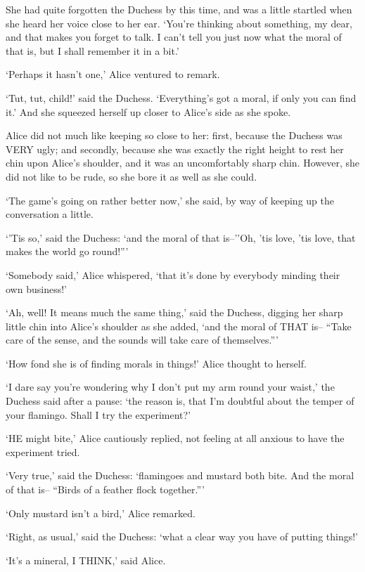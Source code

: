 \documentclass[12pt]{book}
\begin{document}
  She had quite forgotten the Duchess by this time, and was a
little startled when she heard her voice close to her ear.
`You're thinking about something, my dear, and that makes you
forget to talk.  I can't tell you just now what the moral of that
is, but I shall remember it in a bit.'

  `Perhaps it hasn't one,' Alice ventured to remark.

  `Tut, tut, child!' said the Duchess.  `Everything's got a
moral, if only you can find it.'  And she squeezed herself up
closer to Alice's side as she spoke.

  Alice did not much like keeping so close to her:  first,
because the Duchess was VERY ugly; and secondly, because she was
exactly the right height to rest her chin upon Alice's shoulder,
and it was an uncomfortably sharp chin.  However, she did not
like to be rude, so she bore it as well as she could.

  `The game's going on rather better now,' she said, by way of
keeping up the conversation a little.

  `'Tis so,' said the Duchess:  `and the moral of that is--''Oh,
'tis love, 'tis love, that makes the world go round!'''

  `Somebody said,' Alice whispered, `that it's done by everybody
minding their own business!'

  `Ah, well!  It means much the same thing,' said the Duchess,
digging her sharp little chin into Alice's shoulder as she added,
`and the moral of THAT is-- ``Take care of the sense, and the
sounds will take care of themselves.'''

  `How fond she is of finding morals in things!' Alice thought to
herself.

  `I dare say you're wondering why I don't put my arm round your
waist,' the Duchess said after a pause:  `the reason is, that I'm
doubtful about the temper of your flamingo.  Shall I try the
experiment?'

  `HE might bite,' Alice cautiously replied, not feeling at all
anxious to have the experiment tried.

  `Very true,' said the Duchess:  `flamingoes and mustard both
bite.  And the moral of that is-- ``Birds of a feather flock
together.'''

  `Only mustard isn't a bird,' Alice remarked.

  `Right, as usual,' said the Duchess:  `what a clear way you
have of putting things!'

  `It's a mineral, I THINK,' said Alice.
\end{document}
